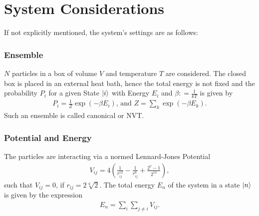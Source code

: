 \section{System Considerations}
If not explicitly mentioned, the system's settings are as follows:
\subsubsection*{Ensemble}
$N$ particles in a box of volume $V$ and temperature $T$ are considered.
The closed box is placed in an external heat bath, hence the total energy is not fixed and the probability $P_i$ for a given State $\ket{i}$ with Energy $E_i$ and $\beta \mathrel{\mathop:}= \frac{1}{kT}$ is given by
\begin{align}
	P_i = \frac{1}{Z}\exp\left(-\beta E_i\right)\text{, and }
	Z = \sum_k \exp\left(-\beta E_k\right).
\end{align}
Such an ensemble is called canonical or NVT.

\subsubsection*{Potential and Energy}
The particles are interacting via a normed Lennard-Jones Potential
\begin{align}
\label{LJPot}
	V_{ij} = 4\left(\frac{1}{r_{ij}^{12}} - \frac{1}{r_{ij}^6} + \frac{2^7 - 1}{2^{14}}\right),
\end{align}
such that $V_{ij}=0$, if $r_{ij} = 2\sqrt[6]2$.
The total energy $E_n$ of the system in a state $\ket{n}$ is given by the expression
\begin{align}
	E_n = \sum_i\sum_{j\neq i}V_{ij}.
\end{align}
\newpage
